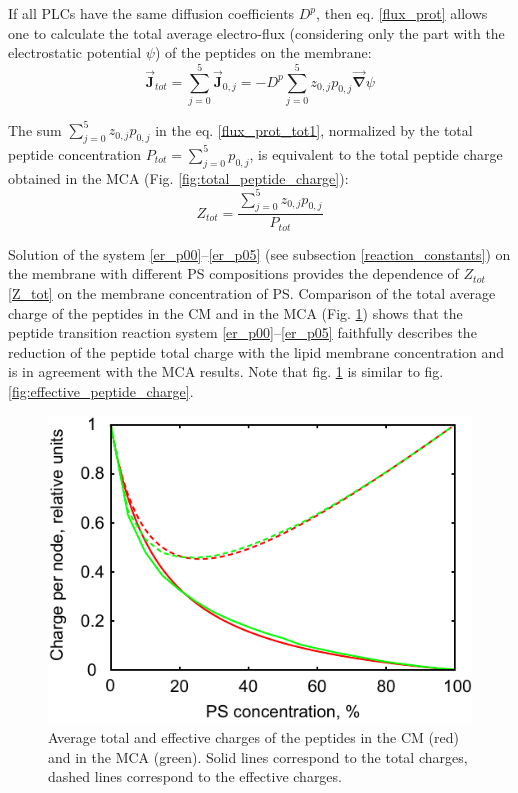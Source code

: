 If all PLCs have the same diffusion coefficients $D^p$, then eq. \eqref{flux_prot} allows one to calculate the total average electro-flux (considering only the part with the electrostatic potential $\psi$) of the peptides on the membrane:
\begin{equation}
\label{flux_prot_tot1}\vec{\mathbf{J}}_{tot}=\sum_{j=0}^5 \vec{\mathbf{J}}_{0,j}=-D^p\sum_{j=0}^5 z_{0,j} p_{0,j} \vec{\mathbf{\nabla}}\psi
\end{equation}

The sum $\sum_{j=0}^5 z_{0,j} p_{0,j}$ in the eq. \eqref{flux_prot_tot1}, normalized by the total peptide concentration $P_{tot} = \sum_{j=0}^5 p_{0,j}$, is equivalent to the total peptide charge obtained in the MCA (Fig. \ref{fig:total_peptide_charge}):
\begin{equation}
 \label{Z_tot}Z_{tot} = \frac{\sum_{j=0}^5 z_{0,j} p_{0,j}}{P_{tot}}
\end{equation}

Solution of the system \eqref{er_p00}--\eqref{er_p05} (see subsection \eqref{reaction_constants}) on the membrane with different PS compositions provides the dependence of $Z_{tot}$ \eqref{Z_tot} on the membrane concentration of PS. Comparison of the total average charge of the peptides in the CM and in the MCA (Fig. \ref{fig:total_effective_charge}) shows that the peptide transition reaction system \eqref{er_p00}--\eqref{er_p05} faithfully describes the reduction of the peptide total charge with the lipid membrane concentration and is in agreement with the MCA results. Note that fig. \ref{fig:total_effective_charge} is similar to fig. \ref{fig:effective_peptide_charge}.

\begin{figure}[!ht]
\begin{center}
 \includegraphics[scale=1.0]{../figures/total_effective_charge_maraphet.pdf}
\end{center}
\caption[Average total and effective charges of the peptides in CM and in MCA]{Average total and effective charges of the peptides in the CM (red) and in the MCA (green). Solid lines correspond to the total charges, dashed lines correspond to the effective charges.}
\label{fig:total_effective_charge}
\end{figure}

